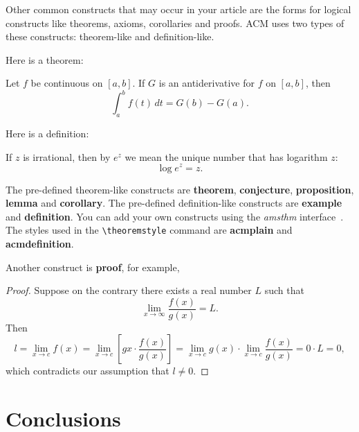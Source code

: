 \documentclass[sigconf]{acmart}
\begin{document}
Other common constructs that may occur in your article are the forms
for logical constructs like theorems, axioms, corollaries and proofs.
ACM uses two types of these constructs:  theorem-like and
definition-like.

Here is a theorem:

\begin{theorem}
  Let $f$ be continuous on $[a,b]$.  If $G$ is
  an antiderivative for $f$ on $[a,b]$, then
  \begin{displaymath}
    \int^b_af(t)\,dt = G(b) - G(a).
  \end{displaymath}
\end{theorem}

Here is a definition:

\begin{definition}
  If $z$ is irrational, then by $e^z$ we mean the
  unique number that has
  logarithm $z$:
  \begin{displaymath}
    \log e^z = z.
  \end{displaymath}
\end{definition}

The pre-defined theorem-like constructs are \textbf{theorem},
\textbf{conjecture}, \textbf{proposition}, \textbf{lemma} and
\textbf{corollary}.  The pre-defined de\-fi\-ni\-ti\-on-like
constructs are \textbf{example} and \textbf{definition}.  You can add
your own constructs using the \textsl{amsthm}
interface~\cite{Amsthm15}.  The styles used in the
\verb|\theoremstyle| command are \textbf{acmplain} and
\textbf{acmdefinition}.

Another construct is \textbf{proof}, for example,

\begin{proof}
  Suppose on the contrary there exists a real number $L$ such that
  \begin{displaymath}
    \lim_{x\rightarrow\infty} \frac{f(x)}{g(x)} = L.
  \end{displaymath}
  Then
  \begin{displaymath}
    l=\lim_{x\rightarrow c} f(x)
    = \lim_{x\rightarrow c}
    \left[ g{x} \cdot \frac{f(x)}{g(x)} \right ]
    = \lim_{x\rightarrow c} g(x) \cdot \lim_{x\rightarrow c}
    \frac{f(x)}{g(x)} = 0\cdot L = 0,
  \end{displaymath}
  which contradicts our assumption that $l\neq 0$.
\end{proof}

\section{Conclusions}
\end{document}
